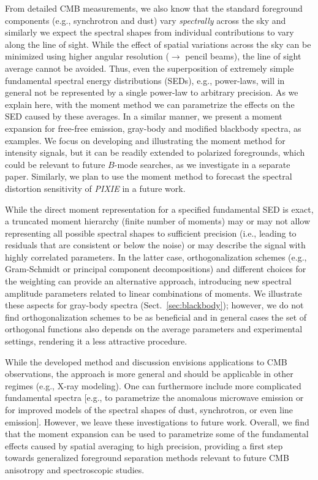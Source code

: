 \documentclass[usenatbib]{mn2e}
\begin{document}
From detailed CMB measurements, we also know that the standard foreground components (e.g., synchrotron and dust) vary {\it spectrally} across the sky \citep[e.g.,][]{Planck2013components, Fuskeland2014, PlanckSM2015} and similarly we expect the spectral shapes from individual contributions to vary along the line of sight. While the effect of spatial variations across the sky can be minimized using higher angular resolution ($\rightarrow$ pencil beams), the line of sight average cannot be avoided. Thus, even the superposition of extremely simple fundamental spectral energy distributions (SEDs), e.g., power-laws, will in general not be represented by a single power-law to arbitrary precision. As we explain here, with the moment method we can parametrize the effects on the SED caused by these averages. In a similar manner, we present a moment expansion for free-free emission, gray-body and modified blackbody spectra, as examples. 
%
We focus on developing and illustrating the moment method for intensity signals, but it can be readily extended to polarized foregrounds, which could be relevant to future $B$-mode searches, as we investigate in a separate paper. Similarly, we plan to use the moment method to forecast the spectral distortion sensitivity of {\it PIXIE} in a future work.

While the direct moment representation for a specified fundamental SED is exact, a truncated moment hierarchy (finite number of moments) may or may not allow representing all possible spectral shapes to sufficient precision (i.e., leading to residuals that are consistent or below the noise) or may describe the signal with highly correlated parameters. In the latter case, orthogonalization schemes (e.g., Gram-Schmidt or principal component decompositions) and different choices for the weighting can provide an alternative approach, introducing new spectral amplitude parameters related to linear combinations of moments. We illustrate these aspects for gray-body spectra (Sect.~\ref{sec:blackbody}); however, we do not find orthogonalization schemes to be as beneficial and in general cases the set of orthogonal functions also depends on the average parameters and experimental settings, rendering it a less attractive procedure.

%
While the developed method and discussion envisions applications to CMB observations, the approach is more general and should be applicable in other regimes (e.g., X-ray modeling). One can furthermore include more complicated fundamental spectra [e.g., to parametrize the anomalous microwave emission \citep{Draine1998, Yacine2009, Hoang2016} or for improved models of the spectral shapes of dust, synchrotron, or even line emission]. However, we leave these investigations to future work. Overall, we find that the moment expansion can be used to parametrize some of the fundamental effects caused by spatial averaging to high precision, providing a first step towards generalized foreground separation methods relevant to future CMB anisotropy and spectroscopic studies.
\end{document}
